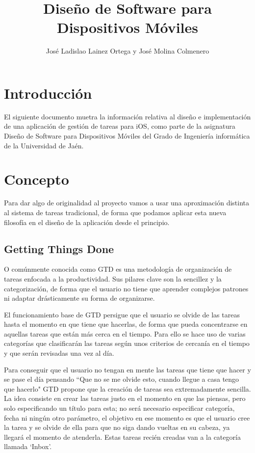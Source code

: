 \documentclass[parskip=half*]{scrartcl}
\title{Dise\~no de Software para Dispositivos M\'oviles}
\author{Jos\'e Ladislao Lainez Ortega y Jos\'e Molina Colmenero}
\begin{document}

\maketitle
\vfill
\tableofcontents

\newpage


\section{Introducci\'on}
El siguiente documento muetra la informaci\'on relativa al dise\~no e implementaci\'on de una aplicaci\'on de gesti\'on de tareas para iOS, como parte de la asignatura Dise\~no de Software para Dispositivos M\'oviles del Grado de Ingenier\'ia inform\'atica de la Universidad de Ja\'en.

\section{Concepto}
Para dar algo de originalidad al proyecto vamos a usar una aproximaci\'on distinta al sistema de tareas tradicional, de forma que podamos aplicar esta nueva filosof\'ia en el dise\~no de la aplicaci\'on desde el principio.

\subsection{Getting Things Done}
O com\'unmente conocida como GTD es una metodolog\'ia de organizaci\'on de tareas enfocada a la productividad. Sus pilares clave son la sencillez y la categorizaci\'on, de forma que el usuario no tiene que aprender complejos patrones ni adaptar dr\'asticamente su forma de organizarse.

El funcionamiento base de GTD persigue que el usuario se olvide de las tareas hasta el momento en que tiene que hacerlas, de forma que pueda concentrarse en aquellas tareas que est\'an m\'as cerca en el tiempo. Para ello se hace uso de varias categor\'ias que clasificar\'an las tareas seg\'un unos criterios de cercan\'ia en el tiempo y que ser\'an revisadas una vez al d\'ia.

Para conseguir que el usuario no tengan en mente las tareas que tiene que hacer y se pase el d\'ia pensando ``Que no se me olvide esto, cuando llegue a casa tengo que hacerlo" GTD propone que la creaci\'on de tareas sea extremadamente sencilla. La idea consiste en crear las tareas justo en el momento en que las piensas, pero solo especificando un t\'itulo para esta; no ser\'a necesario especificar categor\'ia, fecha ni ning\'un otro par\'ametro, el objetivo en ese momento es que el usuario cree la tarea y se olvide de ella para que no siga dando vueltas en su cabeza, ya llegar\'a el momento de atenderla. Estas tareas reci\'en creadas van a la categor\'ia llamada `Inbox'.
\end{document}
